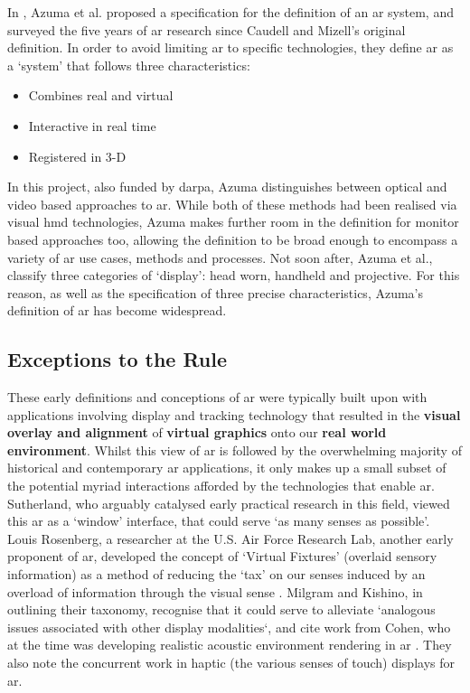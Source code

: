 In \citeyear{azuma1997}, Azuma et al. proposed a specification for the definition of an \gls{ar} system, and surveyed the five years of \gls{ar} research since Caudell and Mizell's original definition. In order to avoid limiting \gls{ar} to specific technologies, they define \gls{ar} as a `system' that follows three characteristics: 

\begin{itemize}
    \item Combines real and virtual
    \item Interactive in real time
    \item Registered in 3-D
\end{itemize}

In this project, also funded by \gls{darpa}, Azuma distinguishes between optical and video based approaches to \gls{ar}. While both of these methods had been realised via visual \gls{hmd} technologies, Azuma makes further room in the definition for monitor based approaches too, allowing the definition to be broad enough to encompass a variety of \gls{ar} use cases, methods and processes. Not soon after, Azuma et al., classify three categories of `display': head worn, handheld and projective. For this reason, as well as the specification of three precise characteristics, Azuma's definition of \gls{ar} has become widespread. 

\subsection{Exceptions to the Rule}\label{sec: review-history-exceptions}
These early definitions and conceptions of \gls{ar} were typically built upon with applications involving display and tracking technology that resulted in the \textbf{visual overlay and alignment} of \textbf{virtual graphics} onto our \textbf{real world environment}. Whilst this view of \gls{ar} is followed by the overwhelming majority of historical and contemporary \gls{ar} applications, it only makes up a small subset of the potential myriad interactions afforded by the technologies that enable \gls{ar}. Sutherland, who arguably catalysed early practical research in this field, viewed this \gls{ar} as a `window' interface, that could serve `as many senses as possible'. Louis Rosenberg, a researcher at the U.S. Air Force Research Lab, another early proponent of \gls{ar}, developed the concept of `Virtual Fixtures' (overlaid sensory information) as a method of reducing the `tax' on our senses induced by an overload of information through the visual sense \citep{rosenberg1993}. Milgram and Kishino, in outlining their taxonomy, recognise that it could serve to alleviate `analogous issues associated with other display modalities`, and cite work from Cohen, who at the time was developing realistic acoustic environment rendering in \gls{ar} \citeyearpar{cohen1993}. They also note the concurrent work in haptic (the various senses of touch) displays for \gls{ar}. 

